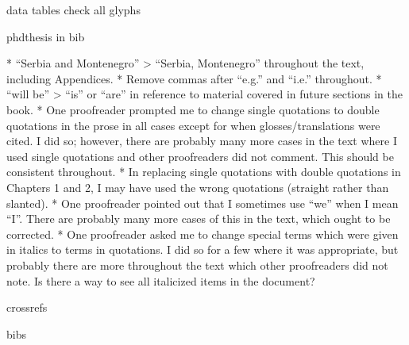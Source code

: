 data 
tables
check all glyphs  

phdthesis in bib
 
 
  *   “Serbia and Montenegro” > “Serbia, Montenegro” throughout the text, including Appendices.
  *   Remove commas after “e.g.” and “i.e.” throughout.
  *   “will be” > “is” or “are” in reference to material covered in future sections in the book.
  * One proofreader prompted me to change single quotations to double quotations in the prose in all cases except for when glosses/translations were cited. I did so; however, there are probably many more cases in the text where I used single quotations and other proofreaders did not comment. This should be consistent throughout.
  *   In replacing single quotations with double quotations in Chapters 1 and 2, I may have used the wrong quotations (straight rather than slanted).
  *   One proofreader pointed out that I sometimes use “we” when I mean “I”. There are probably many more cases of this in the text, which ought to be corrected.
  *   One proofreader asked me to change special terms which were given in italics to terms in quotations. I did so for a few where it was appropriate, but probably there are more throughout the text which other proofreaders did not note. Is there a way to see all italicized items in the document?
  
  crossrefs
  
  bibs
  
  

